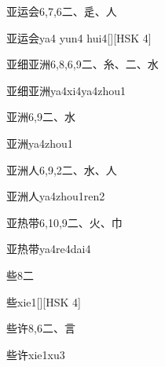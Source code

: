 \begin{Entry}{亚运会}{6,7,6}{⼆、⾡、⼈}
  \begin{Phonetics}{亚运会}{ya4 yun4 hui4}[][HSK 4]
  \end{Phonetics}
\end{Entry}

\begin{Entry}{亚细亚洲}{6,8,6,9}{⼆、⽷、⼆、⽔}
  \begin{Phonetics}{亚细亚洲}{ya4xi4ya4zhou1}
  \end{Phonetics}
\end{Entry}

\begin{Entry}{亚洲}{6,9}{⼆、⽔}
  \begin{Phonetics}{亚洲}{ya4zhou1}
  \end{Phonetics}
\end{Entry}

\begin{Entry}{亚洲人}{6,9,2}{⼆、⽔、⼈}
  \begin{Phonetics}{亚洲人}{ya4zhou1ren2}
  \end{Phonetics}
\end{Entry}

\begin{Entry}{亚热带}{6,10,9}{⼆、⽕、⼱}
  \begin{Phonetics}{亚热带}{ya4re4dai4}
  \end{Phonetics}
\end{Entry}

\begin{Entry}{些}{8}{⼆}
  \begin{Phonetics}{些}{xie1}[][HSK 4]
  \end{Phonetics}
\end{Entry}

\begin{Entry}{些许}{8,6}{⼆、⾔}
  \begin{Phonetics}{些许}{xie1xu3}
  \end{Phonetics}
\end{Entry}


